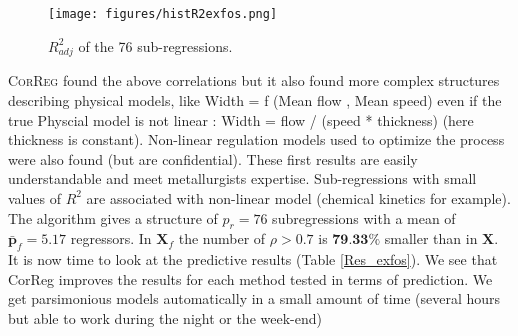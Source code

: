 \documentclass[11pt,a4paper]{article}
\begin{document}
		
		\begin{figure}[h!]
		\centering
			\texttt{[image: figures/histR2exfos.png]} 
			\caption{$R^2_{adj}$ of the 76 sub-regressions.}
\end{figure} 
		
		
	\textsc{CorReg} found the above correlations but it also found more complex structures describing physical models, like   Width = f (Mean flow , Mean speed) even if the true Physcial model is not linear : Width = flow / (speed * thickness) (here thickness is constant). Non-linear regulation models used to optimize the process were also found (but are confidential). These first results are easily understandable and meet metallurgists expertise.  Sub-regressions with small values of $R^2$ are associated with non-linear model (chemical kinetics for example).
			The algorithm gives a structure of $p_r=76$ subregressions with a mean of $\bar{\boldsymbol{p}}_f=5.17$ regressors. In $\boldsymbol{X}_f$ the number of $\rho>0.7$ is $\textbf{79.33\%}$ smaller than in $\boldsymbol{X}$.		
	\\
	
	
			It is now time to look at the predictive results (Table \ref{Res_exfos}). We see that CorReg improves the results for each method tested in terms of prediction.
			We get parsimonious models automatically in a small amount of time (several hours but able to work during the night or the week-end)
\end{document}
